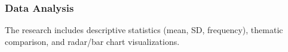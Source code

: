 \subsubsection{Data Analysis}
The research includes descriptive statistics (mean, SD, frequency), thematic comparison, and radar/bar chart visualizations.


